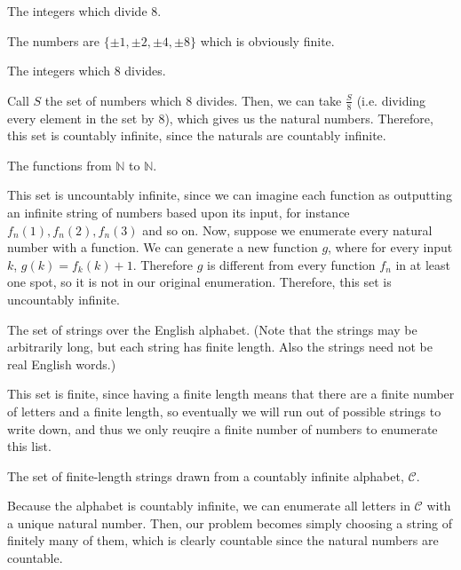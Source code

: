 \documentclass[11pt]{article}
\begin{document}
\begin{Parts}

\Part The integers which divide $8$.

\begin{solution}
  The numbers are $\{\pm 1, \pm 2, \pm 4, \pm 8\}$ which is obviously finite.
\end{solution}

\Part The integers which $8$ divides.

\begin{solution}
  Call $S$ the set of numbers which 8 divides. Then, we can take $\frac{S}{8}$ (i.e. dividing every element in the set by 8), which gives us the natural numbers. Therefore, this set is countably infinite, since the naturals are countably infinite.
\end{solution}

\Part The functions from $\mathbb{N}$ to $\mathbb{N}$.

\begin{solution}
  This set is uncountably infinite, since we can imagine each function as outputting an infinite string of numbers based upon its input, for instance $f_n(1), f_n(2), f_n(3)$ and so on. Now, suppose we enumerate every natural number with a function. We can generate a new function $g$, where for every input $k$, $g(k) = f_k(k) + 1$. Therefore $g$ is different from every function $f_n$ in at least one spot, so it is not in our original enumeration. Therefore, this set is uncountably infinite.
\end{solution}

\Part The set of strings over the English alphabet. (Note that the strings may be arbitrarily long, but each string has finite length. Also the strings need not be real English words.)

\begin{solution}
  This set is finite, since having a finite length means that there are a finite number of letters and a finite length, so eventually we will run out of possible strings to write down, and thus we only reuqire a finite number of numbers to enumerate this list.
\end{solution}

\Part The set of finite-length strings drawn from a countably infinite alphabet, $\mathcal{C}$.

\begin{solution}
  Because the alphabet is countably infinite, we can enumerate all letters in $\mathcal C$ with a unique natural number. Then, our problem becomes simply choosing a string of finitely many of them, which is clearly countable since the natural numbers are countable.
\end{solution}


\end{Parts}
\end{document}
